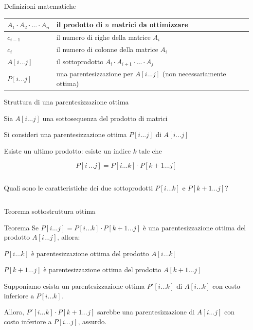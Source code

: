 \begin{frame}{Definizioni matematiche}

\begin{tabular}{|P{3cm}|P{8cm}|}
\hline
$A_1 \cdot A_2 \cdot \ldots \cdot A_n$  & il prodotto di $n$ matrici da ottimizzare \\\hline
$c_{i-1}$ & il numero di righe della matrice $A_i$ \\\hline
$c_i$ & il numero di colonne della matrice $A_i$ \\\hline
$A[i \ldots j]$ & il sottoprodotto $A_i \cdot A_{i+1 }\cdot \ldots \cdot A_j$ \\\hline
$P[i \ldots j]$ & una parentesizzazione per $A[i \ldots j]$ \newline(non necessariamente ottima) \\\hline
\end{tabular}
\end{frame}

\begin{frame}{Struttura di una parentesizzazione ottima}
    
\BIL
\item Sia $A[i \ldots j]$ una sottosequenza del prodotto di matrici
\item Si consideri una parentesizzazione ottima $P[i \ldots j]$ di $A[i \ldots j]$
\item Esiste un \alert{ultimo prodotto}: esiste un indice $k$ tale che 

\[
  P[i\ \ldots j] = P[i \ldots k] \cdot  P[k+1 \ldots j]
\]
\EIL

\begin{columns}[T]
Quali sono le caratteristiche dei due sottoprodotti $P[i \ldots k]$ e $P[k+1 \ldots j]$?
\vspace{-9pt}
\end{columns}

\end{frame}

\begin{frame}{Teorema sottostruttura ottima}

\vspace{-6pt}
\begin{block}{Teorema}
\alert{Se} $P[i \ldots j] =  P[i \ldots k]  \cdot P[k+1 \ldots j]$ è una parentesizzazione ottima del prodotto $A[i \ldots j]$, \alert{allora}:
\BI
\item $P[i \ldots k]$ è parentesizzazione ottima del prodotto $A[i \ldots k]$
\item $P[k+1 \ldots j]$ è parentesizzazione ottima del prodotto $A[k+1 \ldots j]$
\EI
\end{block}

\bigskip
{}
\BIL
\item Supponiamo esista un parentesizzazione ottima $P'[i \ldots k]$ di $A[i \ldots k]$ con costo inferiore a $P[i \ldots k]$.
\item Allora, $P'[i \ldots k] \cdot P[k+1 \ldots j]$ sarebbe una parentesizzazione di $A[i \ldots j]$ con costo inferiore a $P[i \ldots j]$, assurdo.
\EIL

\end{frame}

